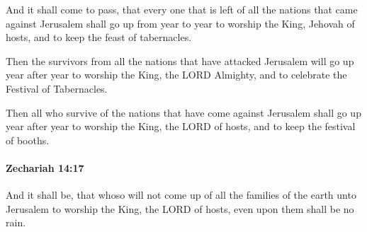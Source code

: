 			\begin{versebox}
					\item[BHS] 
					\item[LXX] 
					\item[ASV] And it shall come to pass, that every one that is left of all the nations that came against Jerusalem shall go up from year to year to worship the King, Jehovah of hosts, and to keep the feast of tabernacles.
					\item[NIV] Then the survivors from all the nations that have attacked Jerusalem will go up year after year to worship the King, the LORD Almighty, and to celebrate the Festival of Tabernacles.
					\item[NRSV] Then all who survive of the nations that have come against Jerusalem shall go up year after year to worship the King, the LORD of hosts, and to keep the festival of booths.
			\end{versebox}

		\paragraph{Zechariah 14:17} %
			\label{ZECHARIAH-14-17}

			And it shall be, that whoso will not come up of all the families of the earth unto Jerusalem to worship the King, the LORD of hosts, even upon them shall be no rain.


